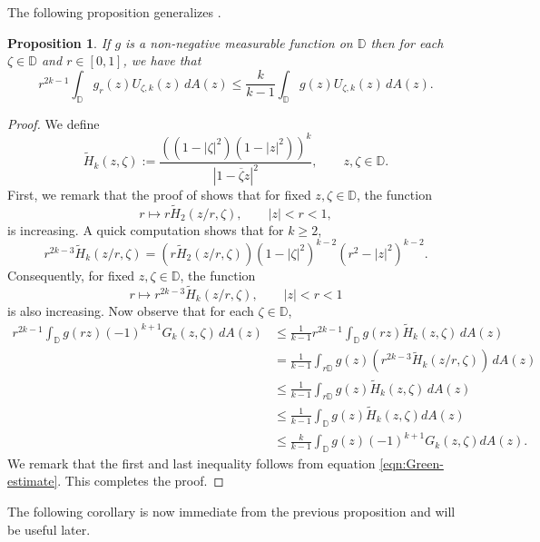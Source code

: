 \documentclass[10pt,oneside,reqno]{amsart}
\newtheorem{proposition}[theorem]{Proposition}
\theoremstyle{definition}
\theoremstyle{remark}
\newcommand{\abs}[1]{\left\lvert #1 \right\rvert}
\renewcommand{\le}{\leqslant}
\renewcommand{\ge}{\geqslant}
\newcommand{\D}{\mathbb D}
\numberwithin{equation}{section}
\begin{document}
The following proposition generalizes \cite[Proposition 2.6]{ARS96}.
\begin{proposition}
    If $g$ is a non-negative measurable function on $\D$ then for each $\zeta \in \D$ and $r \in [0,1]$, we have that 
    \begin{equation*}
        r^{2k-1} \int_{\D} g_r (z) U_{\zeta, k} (z) \, dA (z) \le \frac{k}{k-1} \int_{\D} g (z) U_{\zeta, k }(z) \, dA(z).
    \end{equation*}
\end{proposition}
\begin{proof}
We define
\begin{equation*}
    \tilde{H}_k (z,\zeta) :=  \frac{ \left( \left( 1-\abs{\zeta}^{2} \right) \left( 1- \abs{z}^{2} \right) \right) ^{k} }{\abs{1-\overline{\zeta}z}^{2}}, \qquad z, \zeta \in \D.
\end{equation*}
First, we remark that the proof of \cite[Proposition 2.6]{ARS96} shows that for fixed $z, \zeta \in \D$, the function
\begin{equation*}
    r \mapsto r \tilde{H}_2 (z/r, \zeta), \qquad \abs{z} < r < 1,
\end{equation*}
is increasing. A quick computation shows that for $k \ge 2$,
\begin{equation*}
    r^{2k-3} \tilde{H}_k (z/r,\zeta) = \left(r \tilde{H}_2 (z/r, \zeta)\right) (1 - \abs{\zeta}^2)^{k-2}(r^2 - \abs{z}^2)^{k-2}.
\end{equation*}
Consequently, for fixed $z, \zeta \in \D$, the function
\begin{equation*}
    r \mapsto r^{2k-3} \tilde{H}_k (z/r, \zeta), \qquad \abs{z} < r < 1
\end{equation*}
is also increasing. Now observe that for each $\zeta \in \D$, 
\begin{align*}
    r^{2k-1} \int_{\D} g(rz) (-1)^{k+1}G_k(z,\zeta) \, dA(z) & \le \frac{1}{k-1} r^{2k-1} \int_{\D} g(rz) \tilde{H}_{k} (z, \zeta) \, dA (z) \\
    &= \frac{1}{k-1} \int_{r\D} g(z) \left( r^{2k-3} \tilde{H}_{k} (z/r , \zeta) \right) \, dA(z) \\
    &\le \frac{1}{k-1} \int_{r\D} g(z) \tilde{H}_{k} (z, \zeta) \, dA(z) \\
     &\le \frac{1}{k-1} \int_{\D} g(z) \tilde{H}_{k} (z, \zeta) dA(z)\\
    &\le \frac{k}{k-1} \int_{\D} g(z) (-1)^{k+1}G_k(z,\zeta) dA(z).
\end{align*}
We remark that the first and last inequality follows from equation \eqref{eqn:Green-estimate}. This completes the proof.
\end{proof}
The following corollary is now immediate from the previous proposition and will be useful later.
\end{document}
